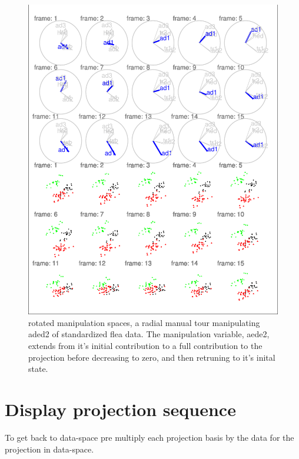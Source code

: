 \documentclass{monashthesis}
\begin{document}
\begin{figure}
\centering
\includegraphics{thesis_files/figure-latex/step3-1.pdf}
\caption{\label{fig:step3}rotated manipulation spaces, a radial manual tour manipulating aded2 of standardized flea data. The manipulation variable, aede2, extends from it's initial contribution to a full contribution to the projection before decreasing to zero, and then retruning to it's inital state.}
\end{figure}

\hypertarget{display-projection-sequence}{%
\section{Display projection sequence}\label{display-projection-sequence}}

To get back to data-space pre multiply each projection basis by the data for the projection in data-space.
\end{document}
